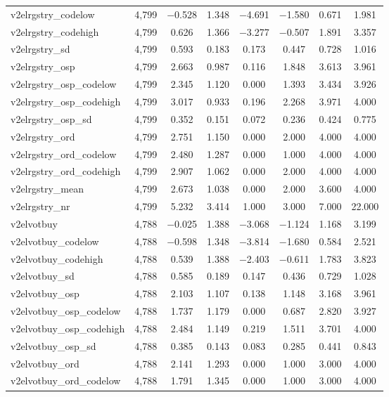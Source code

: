 \begin{table}[!htbp]
\begin{tabular}{@{\extracolsep{5pt}}lccccccc}
v2elrgstry\_codelow & 4,799 & $-$0.528 & 1.348 & $-$4.691 & $-$1.580 & 0.671 & 1.981 \\ 
v2elrgstry\_codehigh & 4,799 & 0.626 & 1.366 & $-$3.277 & $-$0.507 & 1.891 & 3.357 \\ 
v2elrgstry\_sd & 4,799 & 0.593 & 0.183 & 0.173 & 0.447 & 0.728 & 1.016 \\ 
v2elrgstry\_osp & 4,799 & 2.663 & 0.987 & 0.116 & 1.848 & 3.613 & 3.961 \\ 
v2elrgstry\_osp\_codelow & 4,799 & 2.345 & 1.120 & 0.000 & 1.393 & 3.434 & 3.926 \\ 
v2elrgstry\_osp\_codehigh & 4,799 & 3.017 & 0.933 & 0.196 & 2.268 & 3.971 & 4.000 \\ 
v2elrgstry\_osp\_sd & 4,799 & 0.352 & 0.151 & 0.072 & 0.236 & 0.424 & 0.775 \\ 
v2elrgstry\_ord & 4,799 & 2.751 & 1.150 & 0.000 & 2.000 & 4.000 & 4.000 \\ 
v2elrgstry\_ord\_codelow & 4,799 & 2.480 & 1.287 & 0.000 & 1.000 & 4.000 & 4.000 \\ 
v2elrgstry\_ord\_codehigh & 4,799 & 2.907 & 1.062 & 0.000 & 2.000 & 4.000 & 4.000 \\ 
v2elrgstry\_mean & 4,799 & 2.673 & 1.038 & 0.000 & 2.000 & 3.600 & 4.000 \\ 
v2elrgstry\_nr & 4,799 & 5.232 & 3.414 & 1.000 & 3.000 & 7.000 & 22.000 \\ 
v2elvotbuy & 4,788 & $-$0.025 & 1.388 & $-$3.068 & $-$1.124 & 1.168 & 3.199 \\ 
v2elvotbuy\_codelow & 4,788 & $-$0.598 & 1.348 & $-$3.814 & $-$1.680 & 0.584 & 2.521 \\ 
v2elvotbuy\_codehigh & 4,788 & 0.539 & 1.388 & $-$2.403 & $-$0.611 & 1.783 & 3.823 \\ 
v2elvotbuy\_sd & 4,788 & 0.585 & 0.189 & 0.147 & 0.436 & 0.729 & 1.028 \\ 
v2elvotbuy\_osp & 4,788 & 2.103 & 1.107 & 0.138 & 1.148 & 3.168 & 3.961 \\ 
v2elvotbuy\_osp\_codelow & 4,788 & 1.737 & 1.179 & 0.000 & 0.687 & 2.820 & 3.927 \\ 
v2elvotbuy\_osp\_codehigh & 4,788 & 2.484 & 1.149 & 0.219 & 1.511 & 3.701 & 4.000 \\ 
v2elvotbuy\_osp\_sd & 4,788 & 0.385 & 0.143 & 0.083 & 0.285 & 0.441 & 0.843 \\ 
v2elvotbuy\_ord & 4,788 & 2.141 & 1.293 & 0.000 & 1.000 & 3.000 & 4.000 \\ 
v2elvotbuy\_ord\_codelow & 4,788 & 1.791 & 1.345 & 0.000 & 1.000 & 3.000 & 4.000 \\ 

\end{tabular}
\end{table}
